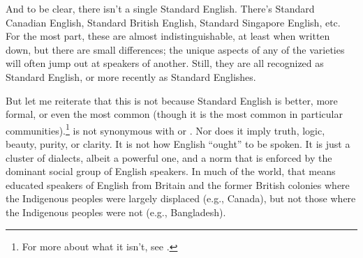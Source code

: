 And to be clear, there isn't a single Standard English. There's Standard Canadian English, Standard British English, Standard Singapore English, etc. For the most part, these are almost indistinguishable, at least when written down, but there are small differences; the unique aspects of any of the varieties will often jump out at speakers of another. Still, they are all recognized as Standard English, or more recently as Standard Englishes.

But let me reiterate that this is not because Standard English is better, more formal, or even the most common (though it is the most common in particular communities).\footnote{For more about what it isn't, see \citet{trudgill99}.}  is not synonymous with  or . Nor does it imply truth, logic, beauty, purity, or clarity. It is not how English \enquote{ought} to be spoken. It is just a cluster of dialects, albeit a powerful one, and a norm that is enforced by the dominant social group of English speakers. In much of the world, that means educated speakers of English from Britain and the former British colonies where the Indigenous peoples were largely displaced (e.g., Canada), but not those where the Indigenous peoples were not (e.g., Bangladesh).


